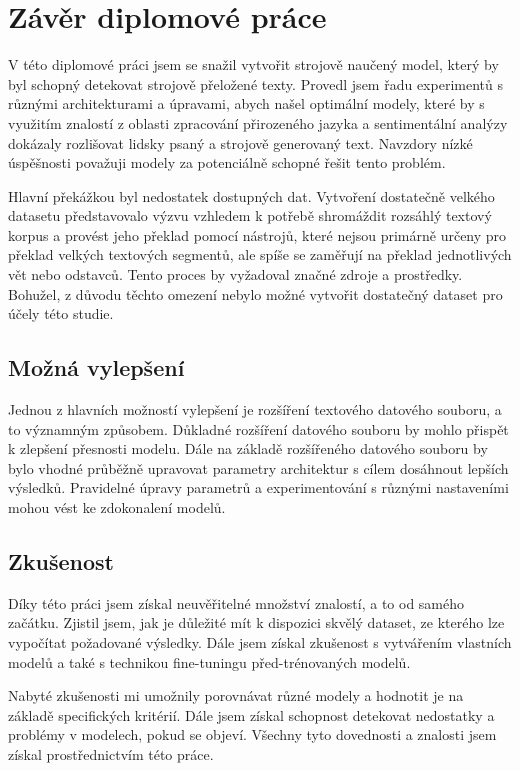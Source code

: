\chapter{Závěr diplomové práce}
V této diplomové práci jsem se snažil vytvořit strojově naučený model, který by byl schopný detekovat strojově přeložené texty.
Provedl jsem řadu experimentů s různými architekturami a úpravami, abych našel optimální modely, které by s využitím znalostí z oblasti zpracování přirozeného jazyka a sentimentální analýzy dokázaly rozlišovat lidsky psaný a strojově generovaný text.
Navzdory nízké úspěšnosti považuji modely za potenciálně schopné řešit tento problém.

Hlavní překážkou byl nedostatek dostupných dat.
Vytvoření dostatečně velkého datasetu představovalo výzvu vzhledem k potřebě shromáždit rozsáhlý textový korpus a provést jeho překlad pomocí nástrojů, které nejsou primárně určeny pro překlad velkých textových segmentů, ale spíše se zaměřují na překlad jednotlivých vět nebo odstavců.
Tento proces by vyžadoval značné zdroje a prostředky.
Bohužel, z důvodu těchto omezení nebylo možné vytvořit dostatečný dataset pro účely této studie.

\section{Možná vylepšení}
Jednou z hlavních možností vylepšení je rozšíření textového datového souboru, a to významným způsobem.
Důkladné rozšíření datového souboru by mohlo přispět k zlepšení přesnosti modelu.
Dále na základě rozšířeného datového souboru by bylo vhodné průběžně upravovat parametry architektur s cílem dosáhnout lepších výsledků.
Pravidelné úpravy parametrů a experimentování s různými nastaveními mohou vést ke zdokonalení modelů.

\section{Zkušenost}
Díky této práci jsem získal neuvěřitelné množství znalostí, a to od samého začátku.
Zjistil jsem, jak je důležité mít k dispozici skvělý dataset, ze kterého lze vypočítat požadované výsledky.
Dále jsem získal zkušenost s vytvářením vlastních modelů a také s technikou fine-tuningu před-trénovaných modelů.

Nabyté zkušenosti mi umožnily porovnávat různé modely a hodnotit je na základě specifických kritérií.
Dále jsem získal schopnost detekovat nedostatky a problémy v modelech, pokud se objeví.
Všechny tyto dovednosti a znalosti jsem získal prostřednictvím této práce.
\endinput
